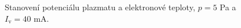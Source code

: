 \documentclass[a4paper,12pt]{article}
\begin{document}
\begin{figure}[h!]
	\centering
	\begin{subfigure}[b]{.49\textwidth}
		\centering
	\end{subfigure}
	\begin{subfigure}[b]{.49\textwidth}
		\centering
	\end{subfigure}
	\caption{Stanovení potenciálu plazmatu a elektronové teploty, $p = 5$ \si{\pascal} a $I_\text{v} = 40$ \si{\milli\ampere}.}
	\label{data7}
\end{figure}
\end{document}
